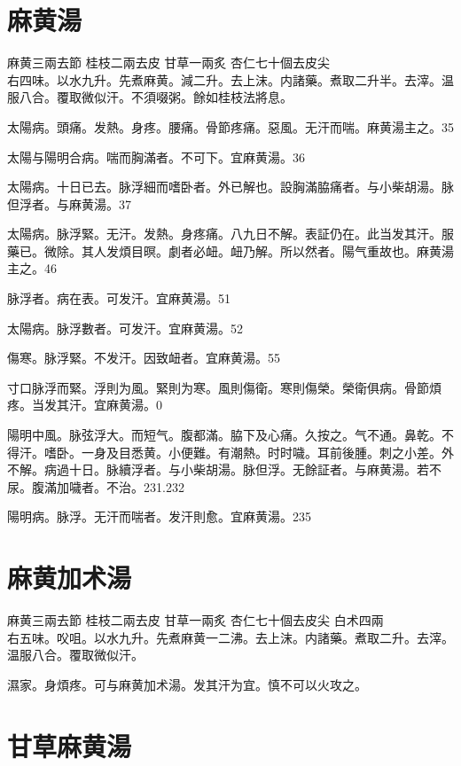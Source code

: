 \section{麻黄湯}

麻黄{\scriptsize 三兩去節} 桂枝{\scriptsize 二兩去皮} 甘草{\scriptsize 一兩炙} 杏仁{\scriptsize 七十個去皮尖}\\
右四味。以水九升。先煮麻黄。減二升。去上沫。内諸藥。煮取二升半。去滓。温服八合。覆取微似汗。不須啜粥。餘如桂枝法將息。

太陽病。頭痛。发熱。身疼。腰痛。骨節疼痛。惡風。无汗而喘。麻黄湯主之。35

太陽与陽明合病。喘而胸滿者。不可下。宜麻黄湯。36

太陽病。十日已去。脉浮細而嗜卧者。外已解也。設胸滿脇痛者。与小柴胡湯。脉{\khaaitp 但}浮者。与麻黄湯。37

太陽病。脉浮緊。无汗。发熱。身疼痛。八九日不解。表証仍在。此当发其汗。服藥已。微除。其人发煩目暝。劇者必衄。衄乃解。所以然者。陽气重故也。麻黄湯主之。46

脉浮者。病在表。可发汗。宜麻黄湯。51

{\khaaitp 太陽病。}脉浮數者。可发汗。宜麻黄湯。52

傷寒。脉浮緊。不发汗。因致衄者。宜麻黄湯。55

{\khaaitp 寸口}脉浮而緊。浮則为風。緊則为寒。風則傷衛。寒則傷榮。榮衛俱病。骨節煩疼。当发其汗。宜麻黄湯。0

陽明中風。脉弦浮大。而短气。腹都滿。脇下及心痛。久按之。气不通。鼻乾。不得汗。嗜卧。一身及目悉黄。小便難。有潮熱。时时噦。耳前後腫。刺之小差。外不解。病過十日。脉續浮者。与{\khaaitp 小}柴胡湯。脉但浮。无餘証者。与麻黄湯。若不尿。腹滿加噦者。不治。231.232

陽明病。脉浮。无汗而喘者。发汗則愈。宜麻黄湯。235

\section{麻黄加术湯}

麻黄{\scriptsize 三兩去節} 桂枝{\scriptsize 二兩去皮} 甘草{\scriptsize 一兩炙} 杏仁{\scriptsize 七十個去皮尖} 白术{\scriptsize 四兩}\\
右五味。㕮咀。以水九升。先煮麻黄一二沸。去上沫。内諸藥。煮取二升。去滓。温服八合。覆取微似汗。

濕家。身煩疼。可与麻黄加术湯。发其汗为宜。慎不可以火攻之。

\section{甘草麻黄湯}

